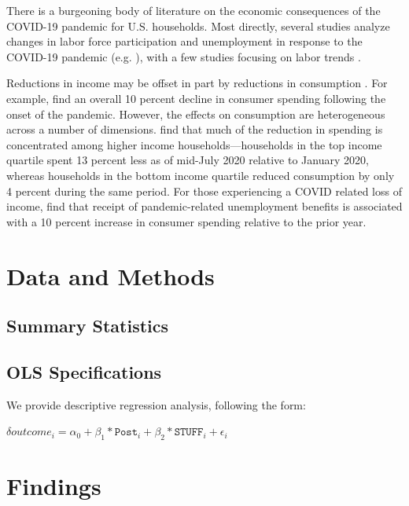 \documentclass[12pt]{article}
\begin{document}
There is a burgeoning body of literature on the economic consequences of the COVID-19 pandemic for U.S. households. Most directly, several studies analyze changes in labor force participation and unemployment in response to the COVID-19 pandemic (e.g.  \cite{cheng2020back}), with a few studies focusing on labor trends  \citep{goda2021impact,moen2020disparate,quinby2021older}.   

Reductions in income may be offset in part by reductions in consumption  \citep{baker2020does,casado2020aggregate,chetty2020did,farrell2020consumption,horvath2021covid}. For example, \cite{farrell2020consumption} find an overall 10 percent decline in consumer spending following the onset of the pandemic. However, the effects on consumption are heterogeneous across a number of dimensions.  \cite{chetty2020did} find that much of the reduction in spending is concentrated among higher income households—households in the top income quartile spent 13 percent less as of mid-July 2020 relative to January 2020, whereas households in the bottom income quartile reduced consumption by only 4 percent during the same period. For those experiencing a COVID related loss of income, \cite{farrell2020consumption} find that receipt of pandemic-related unemployment benefits is associated with a 10 percent increase in consumer spending relative to the prior year. 


 

 
 
\section{Data and Methods}


\subsection{Summary Statistics}


\subsection{OLS Specifications}
We provide descriptive regression analysis, following the form:

$\delta outcome_{i} = \alpha_0 + \beta_1*\texttt{Post}_i + \beta_2*\texttt{STUFF}_i + \epsilon_i $

 

\section{Findings}
\end{document}
